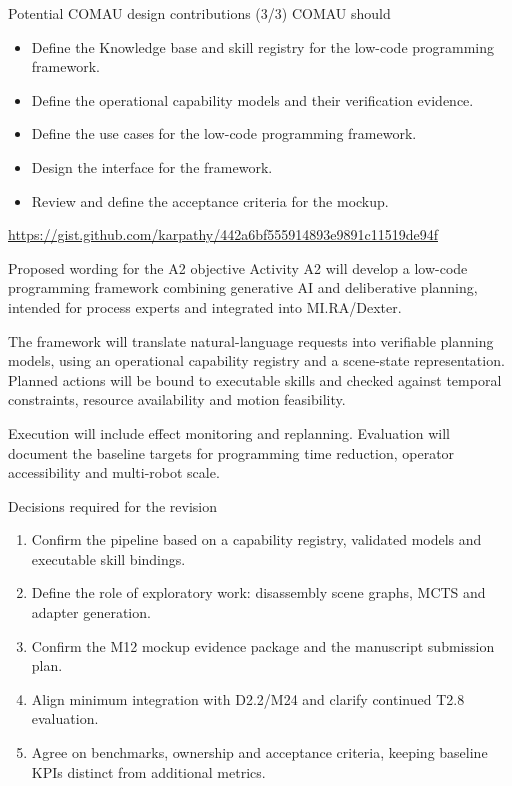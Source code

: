 \documentclass[aspectratio=169,10pt]{beamer}
\begin{document}
\begin{frame}{Potential COMAU design contributions (3/3)}
COMAU should
\begin{itemize}
\item Define the Knowledge base and skill registry for the low-code programming framework.
\item Define the operational capability models and their verification evidence.
\item Define the use cases for the low-code programming framework.
\item Design the interface for the framework.
\item Review and define the acceptance criteria for the mockup.
\end{itemize}
\url{
https://gist.github.com/karpathy/442a6bf555914893e9891c11519de94f
}
\par
\end{frame}


\begin{frame}{Proposed wording for the A2 objective}
Activity A2 will develop a low-code programming framework combining generative AI and deliberative planning, intended for process experts and integrated into MI.RA/Dexter.\par
The framework will translate natural-language requests into verifiable planning models, using an operational capability registry and a scene-state representation. Planned actions will be bound to executable skills and checked against temporal constraints, resource availability and motion feasibility.\par
Execution will include effect monitoring and replanning. Evaluation will document the baseline targets for programming time reduction, operator accessibility and multi-robot scale.
\end{frame}

\begin{frame}{Decisions required for the revision}
\begin{enumerate}\items
\item Confirm the pipeline based on a capability registry, validated models and executable skill bindings.
\item Define the role of exploratory work: disassembly scene graphs, MCTS and adapter generation.
\item Confirm the M12 mockup evidence package and the manuscript submission plan.
\item Align minimum integration with D2.2/M24 and clarify continued T2.8 evaluation.
\item Agree on benchmarks, ownership and acceptance criteria, keeping baseline KPIs distinct from additional metrics.
\end{enumerate}
\end{frame}
\end{document}
